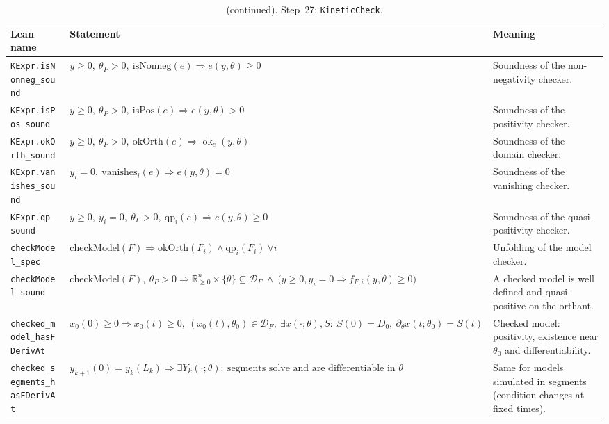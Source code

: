 \addtocounter{table}{-1}
{\small
\begin{longtable}{@{}>{\raggedright\arraybackslash}p{3.6cm}>{\raggedright\arraybackslash}p{6.6cm}>{\raggedright\arraybackslash}p{5.6cm}@{}}
\caption[]{(continued). Step~27: \texttt{KineticCheck}.}\\
\toprule
Lean name & Statement & Meaning \\
\midrule
\endhead
\texttt{KExpr\textquotesingle{}.\allowbreak{}isNonneg\_\allowbreak{}sound} & $\displaystyle y\ge0,\ \theta_P>0,\ \mathrm{isNonneg}(e)\Rightarrow e(y,\theta)\ge0$ & Soundness of the non-negativity checker. \\[3pt]
\texttt{KExpr\textquotesingle{}.\allowbreak{}isPos\_\allowbreak{}sound} & $\displaystyle y\ge0,\ \theta_P>0,\ \mathrm{isPos}(e)\Rightarrow e(y,\theta)>0$ & Soundness of the positivity checker. \\[3pt]
\texttt{KExpr\textquotesingle{}.\allowbreak{}okOrth\_\allowbreak{}sound} & $\displaystyle y\ge0,\ \theta_P>0,\ \mathrm{okOrth}(e)\Rightarrow\operatorname{ok}_e(y,\theta)$ & Soundness of the domain checker. \\[3pt]
\texttt{KExpr\textquotesingle{}.\allowbreak{}vanishes\_\allowbreak{}sound} & $\displaystyle y_i=0,\ \mathrm{vanishes}_i(e)\Rightarrow e(y,\theta)=0$ & Soundness of the vanishing checker. \\[3pt]
\texttt{KExpr\textquotesingle{}.\allowbreak{}qp\_\allowbreak{}sound} & $\displaystyle y\ge0,\ y_i=0,\ \theta_P>0,\ \mathrm{qp}_i(e)\Rightarrow e(y,\theta)\ge0$ & Soundness of the quasi-positivity checker. \\[3pt]
\texttt{checkModel\_\allowbreak{}spec} & $\displaystyle \mathrm{checkModel}(F)\Rightarrow\mathrm{okOrth}(F_i)\wedge\mathrm{qp}_i(F_i)\ \forall i$ & Unfolding of the model checker. \\[3pt]
\texttt{checkModel\_\allowbreak{}sound} & $\displaystyle \mathrm{checkModel}(F),\ \theta_P>0\Rightarrow\mathbb{R}^n_{\ge0}\times\{\theta\}\subseteq\mathcal D_F\ \wedge\ \bigl(y\ge0,y_i=0\Rightarrow f_{F,i}(y,\theta)\ge0\bigr)$ & A checked model is well defined and quasi-positive on the orthant. \\[3pt]
\texttt{checked\_\allowbreak{}model\_\allowbreak{}hasFDerivAt} & $\displaystyle x_0(0)\ge0\Rightarrow x_0(t)\ge0,\ (x_0(t),\theta_0)\in\mathcal D_F,\ \exists x(\cdot;\theta),S:\ S(0)=D_0,\ \partial_\theta x(t;\theta_0)=S(t)$ & Checked model: positivity, existence near $\theta_0$ and differentiability. \\[3pt]
\texttt{checked\_\allowbreak{}segments\_\allowbreak{}hasFDerivAt} & $\displaystyle y_{k+1}(0)=y_k(L_k)\Rightarrow\exists Y_k(\cdot;\theta):\ \text{segments solve and are differentiable in }\theta$ & Same for models simulated in segments (condition changes at fixed times). \\[3pt]

\end{longtable}}
